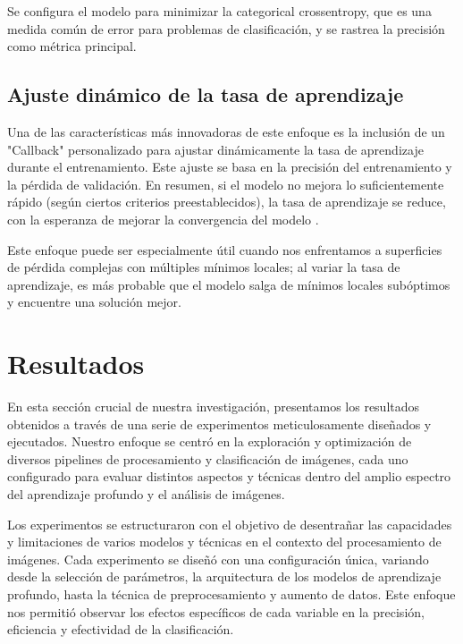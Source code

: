 Se configura el modelo para minimizar la categorical crossentropy, que es una medida común de error para problemas de clasificación, y se rastrea la precisión como métrica principal.

\subsection{Ajuste dinámico de la tasa de aprendizaje}

Una de las características más innovadoras de este enfoque es la inclusión de un "Callback" personalizado para ajustar dinámicamente la tasa de aprendizaje durante el entrenamiento. Este ajuste se basa en la precisión del entrenamiento y la pérdida de validación. En resumen, si el modelo no mejora lo suficientemente rápido (según ciertos criterios preestablecidos), la tasa de aprendizaje se reduce, con la esperanza de mejorar la convergencia del modelo .

Este enfoque puede ser especialmente útil cuando nos enfrentamos a superficies de pérdida complejas con múltiples mínimos locales; al variar la tasa de aprendizaje, es más probable que el modelo salga de mínimos locales subóptimos y encuentre una solución mejor.

\section{Resultados}\label{sec:results}
En esta sección crucial de nuestra investigación, presentamos los resultados obtenidos a través de una serie de experimentos meticulosamente diseñados y ejecutados. Nuestro enfoque se centró en la exploración y optimización de diversos pipelines de procesamiento y clasificación de imágenes, cada uno configurado para evaluar distintos aspectos y técnicas dentro del amplio espectro del aprendizaje profundo y el análisis de imágenes.

Los experimentos se estructuraron con el objetivo de desentrañar las capacidades y limitaciones de varios modelos y técnicas en el contexto del procesamiento de imágenes. Cada experimento se diseñó con una configuración única, variando desde la selección de parámetros, la arquitectura de los modelos de aprendizaje profundo, hasta la técnica de preprocesamiento y aumento de datos. Este enfoque nos permitió observar los efectos específicos de cada variable en la precisión, eficiencia y efectividad de la clasificación.

